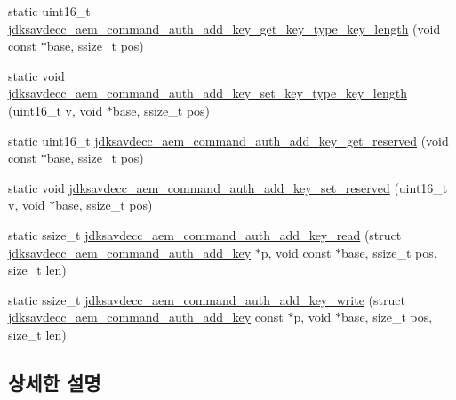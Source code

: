 \begin{DoxyCompactItemize}
\item 
static uint16\+\_\+t \hyperlink{group__command__auth__add__key_ga58c518cf586cdee1ed68ababebbc6b9e}{jdksavdecc\+\_\+aem\+\_\+command\+\_\+auth\+\_\+add\+\_\+key\+\_\+get\+\_\+key\+\_\+type\+\_\+key\+\_\+length} (void const $\ast$base, ssize\+\_\+t pos)
\item 
static void \hyperlink{group__command__auth__add__key_ga44e4a2fc450897df2561add7971b7228}{jdksavdecc\+\_\+aem\+\_\+command\+\_\+auth\+\_\+add\+\_\+key\+\_\+set\+\_\+key\+\_\+type\+\_\+key\+\_\+length} (uint16\+\_\+t v, void $\ast$base, ssize\+\_\+t pos)
\item 
static uint16\+\_\+t \hyperlink{group__command__auth__add__key_gaf6ac3a61c03652a71c4da6715f91ff99}{jdksavdecc\+\_\+aem\+\_\+command\+\_\+auth\+\_\+add\+\_\+key\+\_\+get\+\_\+reserved} (void const $\ast$base, ssize\+\_\+t pos)
\item 
static void \hyperlink{group__command__auth__add__key_ga3aafa3fe0825b9b11db774ad04dee380}{jdksavdecc\+\_\+aem\+\_\+command\+\_\+auth\+\_\+add\+\_\+key\+\_\+set\+\_\+reserved} (uint16\+\_\+t v, void $\ast$base, ssize\+\_\+t pos)
\item 
static ssize\+\_\+t \hyperlink{group__command__auth__add__key_gab262bf55eefaea9279d3c2e4e9a231b4}{jdksavdecc\+\_\+aem\+\_\+command\+\_\+auth\+\_\+add\+\_\+key\+\_\+read} (struct \hyperlink{structjdksavdecc__aem__command__auth__add__key}{jdksavdecc\+\_\+aem\+\_\+command\+\_\+auth\+\_\+add\+\_\+key} $\ast$p, void const $\ast$base, ssize\+\_\+t pos, size\+\_\+t len)
\item 
static ssize\+\_\+t \hyperlink{group__command__auth__add__key_ga548aee15fa3867226ff0886693614b36}{jdksavdecc\+\_\+aem\+\_\+command\+\_\+auth\+\_\+add\+\_\+key\+\_\+write} (struct \hyperlink{structjdksavdecc__aem__command__auth__add__key}{jdksavdecc\+\_\+aem\+\_\+command\+\_\+auth\+\_\+add\+\_\+key} const $\ast$p, void $\ast$base, size\+\_\+t pos, size\+\_\+t len)
\end{DoxyCompactItemize}


\subsection{상세한 설명}


